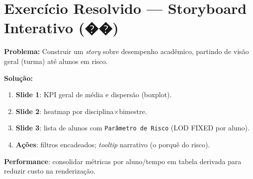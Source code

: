 \section{Exercício Resolvido — Storyboard Interativo (��)}
\begin{SolvedBox}
\textbf{Problema:} Construir um \textit{story} sobre desempenho acadêmico, partindo de visão geral (turma) até alunos em risco.

\textbf{Solução:}
\begin{enumerate}[leftmargin=*]
  \item \textbf{Slide 1}: KPI geral de média e dispersão (boxplot).
  \item \textbf{Slide 2}: heatmap por disciplina$\times$bimestre.
  \item \textbf{Slide 3}: lista de alunos com \texttt{Parâmetro de Risco} (LOD FIXED por aluno).
  \item \textbf{Ações}: filtros encadeados; \textit{tooltip} narrativo (o porquê do risco).
\end{enumerate}
\textbf{Performance}: consolidar métricas por aluno/tempo em tabela derivada para reduzir custo na renderização.
\end{SolvedBox}

